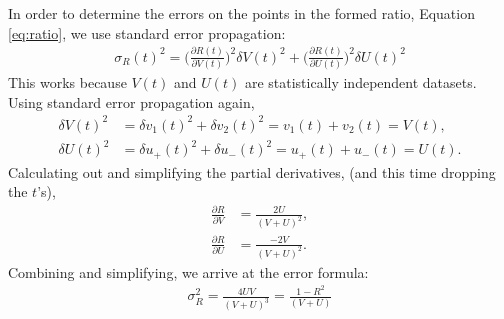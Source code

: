  In order to determine the errors on the points in the formed ratio, Equation \ref{eq:ratio}, we use standard error propagation:
 	\begin{align}
 		\sigma_{R}(t)^{2} = \Big(\frac{\partial R(t)}{\partial V(t)}\Big)^{2} \delta V(t)^{2} + \Big(\frac{\partial R(t)}{\partial U(t)}\Big)^{2} \delta U(t)^{2}
	\end{align}
This works because $V(t)$ and $U(t)$ are statistically independent datasets. Using standard error propagation again, 
	\begin{equation}	
	\begin{aligned}
  		\delta V(t)^{2} &= \delta v_{1}(t)^{2} + \delta v_{2}(t)^{2} = v_{1}(t) + v_{2}(t) = V(t), \\ 
  		\delta U(t)^{2} &= \delta u_{+}(t)^{2} + \delta u_{-}(t)^{2} = u_{+}(t) + u_{-}(t) = U(t).
	\end{aligned}
	\end{equation}
Calculating out and simplifying the partial derivatives, (and this time dropping the $t$'s),
	\begin{equation}	
	\begin{aligned}
  		\frac{\partial R}{\partial V} &= \frac{2U}{(V + U)^{2}}, \\ 
  		\frac{\partial R}{\partial U} &= \frac{-2V}{(V + U)^{2}}.
	\end{aligned}
	\end{equation}
Combining and simplifying, we arrive at the error formula:
 	\begin{align}
 		\sigma_{R}^{2} = \frac{4UV}{(V + U)^{3}} = \frac{1-R^{2}}{(V + U)} 
	\end{align}



